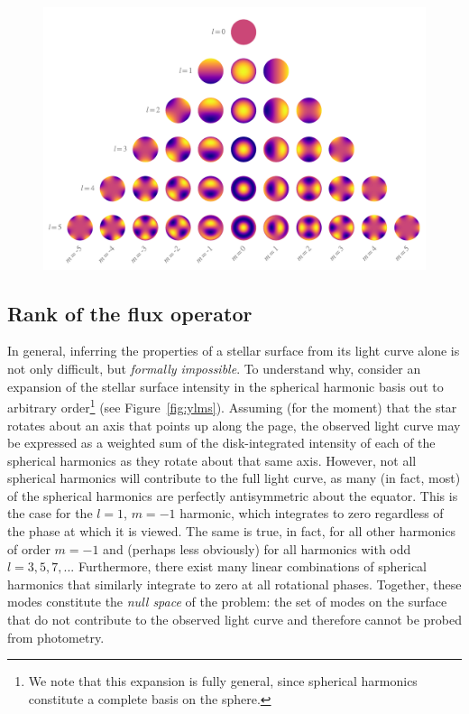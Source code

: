 \documentclass[modern]{aastex62}
\newcommand{\dfm}[1]{{\color{blue}#1}}
\begin{document}
\begin{figure}[t!]
    \begin{centering}
        \includegraphics[width=\linewidth]{figures/ylms.pdf}
    \end{centering}
\end{figure}

\subsection{Rank of the flux operator}
%
In general, inferring the properties of a stellar surface from its light curve alone
is not
only difficult, but \emph{formally impossible}. To understand why, consider
an expansion of the stellar surface intensity in the spherical
harmonic basis out to arbitrary order\footnote{\dfm{We note that this expansion is fully general, since spherical harmonics constitute a complete basis on the sphere.}} (see Figure~\ref{fig:ylms}).
Assuming (for the moment) that the
star rotates about an axis that points up along the page, the observed
light curve may be expressed as a weighted sum of the disk-integrated intensity
of each of the spherical harmonics as they rotate about that same axis.
However, not all spherical harmonics will contribute to the full light curve,
as many (in fact, most) of the spherical harmonics are perfectly antisymmetric
about the equator. This is the case for
the $l = 1$, $m = -1$ harmonic, which integrates to zero regardless of
the phase at which it is viewed. The same is true, in fact, for all other harmonics
of order $m = -1$ and (perhaps less obviously) for all harmonics with odd
$l = 3, 5, 7, ...$ Furthermore, there exist many linear combinations of
spherical harmonics that similarly integrate to zero at all rotational
phases. Together, these modes constitute the \emph{null space} of the problem:
the set of modes on the surface that do not contribute to the observed
light curve and therefore cannot be probed from photometry.
\end{document}
